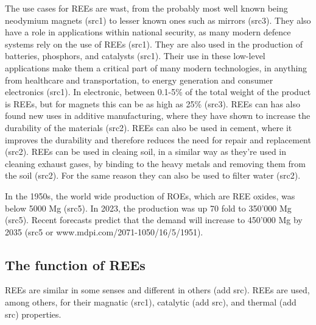 The use cases for REEs are wast, from the probably most well known being neodymium magnets (src1) to lesser known ones such as mirrors (src3). They also have a role in applications within national security, as many modern defence systems rely on the use of REEs (src1). They are also used in the production of batteries, phosphors, and catalysts (src1). Their use in these low-level applications make them a critical part of many modern technologies, in anything from healthcare and transportation, to energy generation and consumer electronics (src1). In electronic, between 0.1-5\% of the total weight of the product is REEs, but for magnets this can be as high as 25\% (src3). REEs can has also found new uses in additive manufacturing, where they have shown to increase the durability of the materials (src2). REEs can also be used in cement, where it improves the durability and therefore reduces the need for repair and replacement (src2). REEs can be used in cleaing soil, in a similar way as they're used in cleaning exhaust gases, by binding to the heavy metals and removing them from the soil (src2). For the same reason they can also be used to filter water (src2).

In the 1950s, the world wide production of ROEs, which are REE oxides, was below 5000 Mg (src5). In 2023, the production was up 70 fold to 350'000 Mg (src5). Recent forecasts predict that the demand will increase to 450'000 Mg by 2035 (src5 or www.mdpi.com/2071-1050/16/5/1951).

\subsection{The function of REEs}

REEs are similar in some senses and different in others (add src). REEs are used, among others, for their magnatic (src1), catalytic (add src), and thermal (add src) properties.